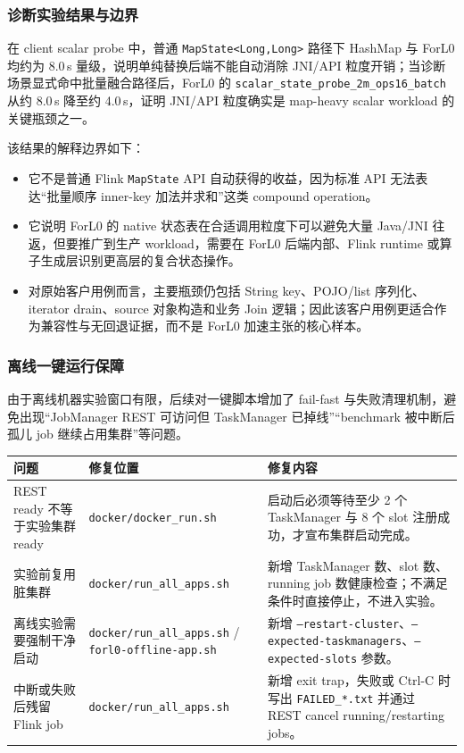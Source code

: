 \documentclass[a4paper,11pt]{article}
\begin{document}
\subsubsection{诊断实验结果与边界}

在 client scalar probe 中，普通 \texttt{MapState<Long,Long>} 路径下 HashMap 与 ForL0 均约为 8.0\,s 量级，说明单纯替换后端不能自动消除 JNI/API 粒度开销；当诊断场景显式命中批量融合路径后，ForL0 的 \texttt{scalar\_state\_probe\_2m\_ops16\_batch} 从约 8.0\,s 降至约 4.0\,s，证明 JNI/API 粒度确实是 map-heavy scalar workload 的关键瓶颈之一。

该结果的解释边界如下：

\begin{itemize}
  \item 它不是普通 Flink \texttt{MapState} API 自动获得的收益，因为标准 API 无法表达“批量顺序 inner-key 加法并求和”这类 compound operation。
  \item 它说明 ForL0 的 native 状态表在合适调用粒度下可以避免大量 Java/JNI 往返，但要推广到生产 workload，需要在 ForL0 后端内部、Flink runtime 或算子生成层识别更高层的复合状态操作。
  \item 对原始客户用例而言，主要瓶颈仍包括 String key、POJO/list 序列化、iterator drain、source 对象构造和业务 Join 逻辑；因此该客户用例更适合作为兼容性与无回退证据，而不是 ForL0 加速主张的核心样本。
\end{itemize}

\subsubsection{离线一键运行保障}

由于离线机器实验窗口有限，后续对一键脚本增加了 fail-fast 与失败清理机制，避免出现“JobManager REST 可访问但 TaskManager 已掉线”“benchmark 被中断后孤儿 job 继续占用集群”等问题。

\begin{table}[H]
\centering
\small
\begin{tabularx}{\textwidth}{L{4.2cm} L{4.0cm} X}
\toprule
\textbf{问题} & \textbf{修复位置} & \textbf{修复内容} \\
\midrule
REST ready 不等于实验集群 ready & \texttt{docker/docker\_run.sh} & 启动后必须等待至少 2 个 TaskManager 与 8 个 slot 注册成功，才宣布集群启动完成。 \\
实验前复用脏集群 & \texttt{docker/run\_all\_apps.sh} & 新增 TaskManager 数、slot 数、running job 数健康检查；不满足条件时直接停止，不进入实验。 \\
离线实验需要强制干净启动 & \texttt{docker/run\_all\_apps.sh} / \texttt{forl0-offline-app.sh} & 新增 \texttt{--restart-cluster}、\texttt{--expected-taskmanagers}、\texttt{--expected-slots} 参数。 \\
中断或失败后残留 Flink job & \texttt{docker/run\_all\_apps.sh} & 新增 exit trap，失败或 Ctrl-C 时写出 \texttt{FAILED\_*.txt} 并通过 REST cancel running/restarting jobs。 \\
\bottomrule
\end{tabularx}
\end{table}
\end{document}
